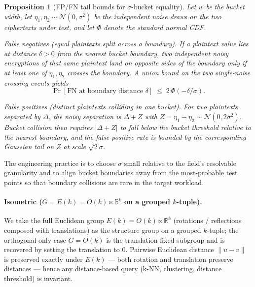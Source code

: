 \documentclass[11pt,letterpaper]{article}
\newtheorem{proposition}[theorem]{Proposition}
\begin{document}
\begin{proposition}[FP/FN tail bounds for $\sigma$-bucket equality]
\label{prop:bucket-fp-fn}
Let $w$ be the bucket width, let $\eta_1, \eta_2 \sim
\mathcal{N}(0, \sigma^2)$ be the independent noise draws on the
two ciphertexts under test, and let $\Phi$ denote the standard
normal CDF.

\emph{False negatives (equal plaintexts split across a boundary).}
If a plaintext value lies at distance $\delta > 0$ from the
nearest bucket boundary, two independent noisy encryptions of
that same plaintext land on opposite sides of the boundary only
if at least one of $\eta_1, \eta_2$ crosses the boundary.
A union bound on the two single-noise crossing events yields
\[
\Pr[\text{FN at boundary distance }\delta]
\;\leq\;
2\,\Phi(-\delta / \sigma).
\]

\emph{False positives (distinct plaintexts colliding in one bucket).}
For two plaintexts separated by $\Delta$, the noisy separation
is $\Delta + Z$ with $Z = \eta_1 - \eta_2 \sim \mathcal{N}(0,
2\sigma^2)$. Bucket collision then requires $|\Delta + Z|$ to
fall below the bucket threshold relative to the nearest boundary,
and the false-positive rate is bounded by the corresponding
Gaussian tail on $Z$ at scale $\sqrt{2}\sigma$.
\end{proposition}

\noindent
The engineering practice is to choose $\sigma$ small relative to
the field's resolvable granularity and to align bucket boundaries
away from the most-probable test points so that boundary
collisions are rare in the target workload.

\paragraph{Isometric ($G = E(k) = O(k) \ltimes \mathbb{R}^k$ on a grouped $k$-tuple).}
We take the full Euclidean group $E(k) = O(k) \ltimes \mathbb{R}^k$
(rotations / reflections composed with translations) as the
structure group on a grouped $k$-tuple; the orthogonal-only case
$G = O(k)$ is the translation-fixed subgroup and is recovered by
setting the translation to $0$. Pairwise Euclidean distance
$\|u - v\|$ is preserved exactly under $E(k)$ --- both rotation
and translation preserve distances --- hence any distance-based
query (k-NN, clustering, distance threshold) is invariant.
\end{document}
